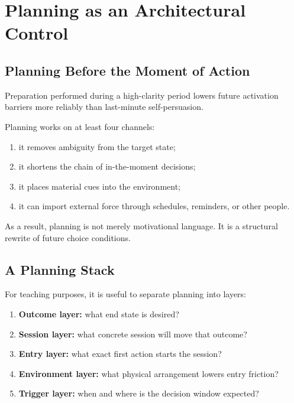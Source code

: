\chapter{Planning as an Architectural Control}
\label{ch:planning}

\section{Planning Before the Moment of Action}

\begin{theorem}
Preparation performed during a high-clarity period lowers future activation
barriers more reliably than last-minute self-persuasion.
\end{theorem}

\begin{discussion}
Planning works on at least four channels:
\begin{enumerate}[nosep]
  \item it removes ambiguity from the target state;
  \item it shortens the chain of in-the-moment decisions;
  \item it places material cues into the environment;
  \item it can import external force through schedules, reminders, or other
        people.
\end{enumerate}
As a result, planning is not merely motivational language. It is a structural
rewrite of future choice conditions.
\end{discussion}

\section{A Planning Stack}

For teaching purposes, it is useful to separate planning into layers:
\begin{enumerate}[nosep]
  \item \textbf{Outcome layer:} what end state is desired?
  \item \textbf{Session layer:} what concrete session will move that outcome?
  \item \textbf{Entry layer:} what exact first action starts the session?
  \item \textbf{Environment layer:} what physical arrangement lowers entry
        friction?
  \item \textbf{Trigger layer:} when and where is the decision window expected?
\end{enumerate}

